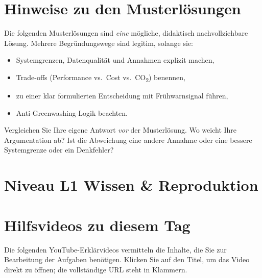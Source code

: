 \documentclass[11pt,a4paper,oneside]{article}
\begin{document}
\section*{Hinweise zu den Musterl\"osungen}
\thispagestyle{plain}

\noindent Die folgenden Musterl\"osungen sind \emph{eine} m\"ogliche, didaktisch nachvollziehbare L\"osung. Mehrere Begr\"undungswege sind legitim, solange sie:

\begin{itemize}
  \item Systemgrenzen, Datenqualit\"at und Annahmen explizit machen,
  \item Trade-offs (Performance vs.\ Cost vs.\ CO\textsubscript{2}) benennen,
  \item zu einer klar formulierten Entscheidung mit Fr\"uhwarnsignal f\"uhren,
  \item Anti-Greenwashing-Logik beachten.
\end{itemize}

\begin{infobox}
Vergleichen Sie Ihre eigene Antwort \emph{vor} der Musterl\"osung. Wo weicht Ihre Argumentation ab? Ist die Abweichung eine andere Annahme oder eine bessere Systemgrenze \textendash{} oder ein Denkfehler?
\end{infobox}

\clearpage

\section*{Niveau L1 \textendash{} Wissen \& Reproduktion}

\section*{Hilfsvideos zu diesem Tag}
\thispagestyle{plain}

\noindent Die folgenden YouTube-Erkl\"arvideos vermitteln die Inhalte, die Sie zur Bearbeitung der Aufgaben ben\"otigen. Klicken Sie auf den Titel, um das Video direkt zu \"offnen; die vollst\"andige URL steht in Klammern.
\end{document}
